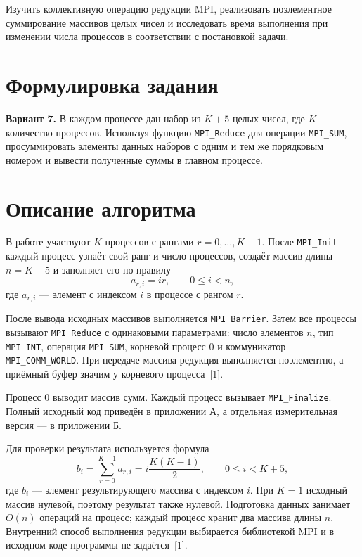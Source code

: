 \documentclass[14pt,a4paper]{extarticle}
\begin{document}
Изучить коллективную операцию редукции MPI, реализовать поэлементное
суммирование массивов целых чисел и исследовать время выполнения
при изменении числа процессов в соответствии с постановкой задачи.

\section{Формулировка задания}

\textbf{Вариант 7.} В каждом процессе дан набор из $K+5$ целых чисел,
где $K$ — количество процессов. Используя функцию \texttt{MPI\_Reduce}
для операции \texttt{MPI\_SUM}, просуммировать элементы данных наборов
с одним и тем же порядковым номером и вывести полученные суммы в главном
процессе.

\section{Описание алгоритма}

В работе участвуют $K$ процессов с рангами $r=0,\ldots,K-1$.
После \texttt{MPI\_Init} каждый процесс узнаёт свой ранг и число процессов,
создаёт массив длины $n=K+5$ и заполняет его по правилу
\begin{equation}
 a_{r,i}=ir,\qquad 0\leq i<n,
\end{equation}
где $a_{r,i}$ — элемент с индексом $i$ в процессе с рангом $r$.

После вывода исходных массивов выполняется \texttt{MPI\_Barrier}.
Затем все процессы вызывают \texttt{MPI\_Reduce} с одинаковыми
параметрами: число элементов $n$, тип \texttt{MPI\_INT}, операция
\texttt{MPI\_SUM}, корневой процесс 0 и коммуникатор
\texttt{MPI\_COMM\_WORLD}. При передаче массива редукция выполняется
поэлементно, а приёмный буфер значим у корневого процесса~[1].

Процесс 0 выводит массив сумм. Каждый процесс вызывает
\texttt{MPI\_Finalize}. Полный исходный код приведён в приложении А,
а отдельная измерительная версия — в приложении Б.

Для проверки результата используется формула
\begin{equation}
\label{eq:expected}
 b_i=\sum_{r=0}^{K-1}a_{r,i}
     =i\frac{K(K-1)}{2},\qquad 0\leq i<K+5,
\end{equation}
где $b_i$ — элемент результирующего массива с индексом $i$.
При $K=1$ исходный массив нулевой, поэтому результат также нулевой.
Подготовка данных занимает $O(n)$ операций на процесс; каждый процесс
хранит два массива длины $n$. Внутренний способ выполнения редукции
выбирается библиотекой MPI и в исходном коде программы не задаётся~[1].
\end{document}
